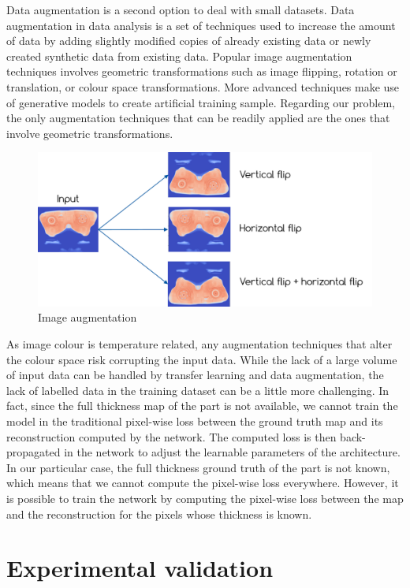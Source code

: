 Data augmentation is a second option to deal with small datasets. Data augmentation in data analysis is a set of techniques used to increase the amount of data by adding slightly modified copies of already existing data or newly created synthetic data from existing data. Popular image augmentation techniques involves geometric transformations such as image flipping, rotation or translation, or colour space transformations. More advanced techniques make use of generative models to create artificial training sample. Regarding our problem, the only augmentation techniques that can be readily applied are the ones that involve geometric transformations. 
\begin{figure}
\centering
\includegraphics[scale=0.8]{images/chapter_4/data_augmentation.png}
\caption{Image augmentation}
\label{fig:image_augmentation}
\end{figure}

As image colour is temperature related, any augmentation techniques that alter the colour space risk corrupting the input data.
While the lack of a large volume of input data can be handled by transfer learning and data augmentation, the lack of labelled data in the training dataset can be a little more challenging. In fact, since the full thickness map of the part is not available, we cannot train the model in the traditional pixel-wise loss between the ground truth map and its reconstruction computed by the network. The computed loss is then back-propagated in the network to adjust the learnable parameters of the architecture. In our particular case, the full thickness ground truth of the part is not known, which means that we cannot compute the pixel-wise loss everywhere. However, it is possible to train the network by computing the pixel-wise loss between the map and the reconstruction for the pixels whose thickness is known.

\section{Experimental validation} \label{Experimental Validation}

